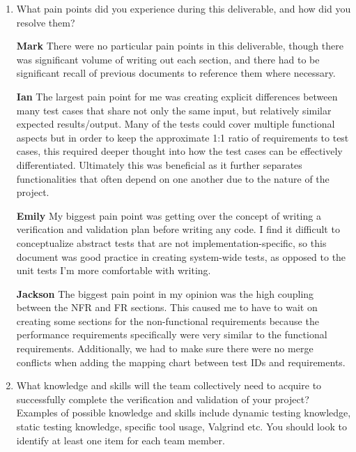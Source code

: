 \documentclass[12pt, titlepage]{article}
\begin{document}
\begin{enumerate}[leftmargin=*]
  \item What pain points did you experience during this deliverable, and how
    did you resolve them?

  \textbf{Mark} There were no particular pain points in this deliverable, though there was significant 
  volume of writing out each section, and there had to be significant recall of previous documents to 
  reference them where necessary.

  \textbf{Ian} The largest pain point for me was creating explicit differences between many test cases 
  that share not only the same input, but relatively similar expected results/output. Many of the tests 
  could cover multiple functional aspects but in order to keep the approximate 1:1 ratio of requirements 
  to test cases, this required deeper thought into how the test cases can be effectively differentiated. 
  Ultimately this was beneficial as it further separates functionalities that often depend on one another 
  due to the nature of the project.

  \textbf{Emily} My biggest pain point was getting over the concept of writing a verification and 
  validation plan before writing any code. I find it difficult to conceptualize abstract tests that are 
  not implementation-specific, so this document was good practice in creating system-wide tests, as 
  opposed to the unit tests I'm more comfortable with writing.

  \textbf{Jackson} The biggest pain point in my opinion was the high coupling between the NFR and FR sections. 
  This caused me to have to wait on creating some sections for the non-functional requirements because the 
  performance requirements specifically were very similar to the functional requirements. Additionally, we 
  had to make sure there were no merge conflicts when adding the mapping chart between test IDs and requirements.

  \item What knowledge and skills will the team collectively need to acquire to
  successfully complete the verification and validation of your project?
  Examples of possible knowledge and skills include dynamic testing knowledge,
  static testing knowledge, specific tool usage, Valgrind etc.  You should look to
  identify at least one item for each team member. 


\end{enumerate}
\end{document}
